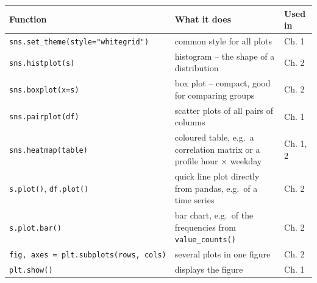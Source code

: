 \documentclass[
  letterpaper,
  DIV=11,
  numbers=noendperiod]{scrreprt}
\begin{document}
\begin{longtable}[]{@{}
  >{\raggedright\arraybackslash}p{}
  >{\raggedright\arraybackslash}p{}
  >{\raggedright\arraybackslash}p{}@{}}
\toprule\noalign{}
\begin{minipage}[b]{\linewidth}\raggedright
Function
\end{minipage} & \begin{minipage}[b]{\linewidth}\raggedright
What it does
\end{minipage} & \begin{minipage}[b]{\linewidth}\raggedright
Used in
\end{minipage} \\
\midrule\noalign{}
\endhead
\bottomrule\noalign{}
\endlastfoot
\texttt{sns.set\_theme(style="whitegrid")} & common style for all plots
& Ch. 1 \\
\texttt{sns.histplot(s)} & histogram -- the shape of a distribution &
Ch. 2 \\
\texttt{sns.boxplot(x=s)} & box plot -- compact, good for comparing
groups & Ch. 2 \\
\texttt{sns.pairplot(df)} & scatter plots of all pairs of columns & Ch.
1 \\
\texttt{sns.heatmap(table)} & coloured table, e.g.~a correlation matrix
or a profile hour × weekday & Ch. 1, 2 \\
\texttt{s.plot()}, \texttt{df.plot()} & quick line plot directly from
pandas, e.g.~of a time series & Ch. 2 \\
\texttt{s.plot.bar()} & bar chart, e.g.~of the frequencies from
\texttt{value\_counts()} & Ch. 2 \\
\texttt{fig,\ axes\ =\ plt.subplots(rows,\ cols)} & several plots in one
figure & Ch. 2 \\
\texttt{plt.show()} & displays the figure & Ch. 1 \\
\end{longtable}
\end{document}
